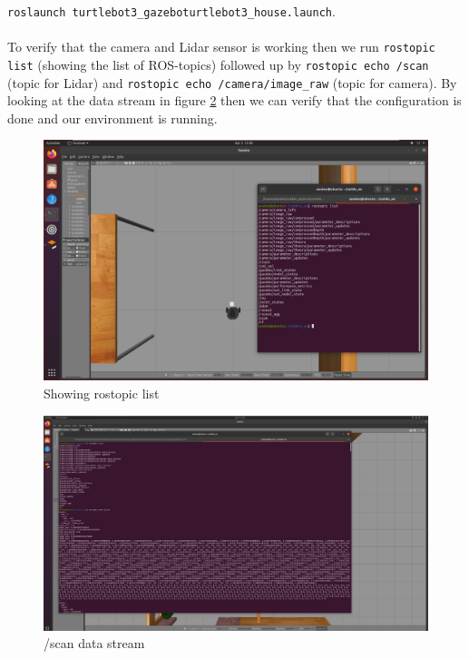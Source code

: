 \documentclass[12pt,a4paper]{article}
\begin{document}
	\noindent\texttt{roslaunch turtlebot3\_gazebo}\texttt{turtlebot3\_house.launch}.
	\\\\
	To verify that the camera and Lidar sensor is working then we run \texttt{rostopic list} (showing the list of ROS-topics) followed up by \texttt{rostopic echo /scan} (topic for Lidar) and \texttt{rostopic echo /camera/image\_raw} (topic for camera). By looking at the data stream in figure \ref{fig:fig5} then we can verify that the configuration is done and our environment is running.
	\begin{figure}[!h]
		\centering
		\includegraphics[width=\linewidth]{fig4.png}
		\caption{Showing rostopic list}
		\label{fig:fig4}
	\end{figure}
	\begin{figure}[!h]
		\centering
		\includegraphics[width=\linewidth]{fig5.png}
		\caption{/scan data stream}
		\label{fig:fig5}
	\end{figure}
\end{document}
